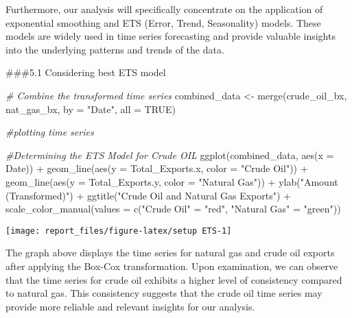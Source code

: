\documentclass[
]{article}
\newenvironment{Shaded}{\begin{snugshade}}{\end{snugshade}}
\newcommand{\AttributeTok}[1]{\textcolor[rgb]{0.77,0.63,0.00}{#1}}
\newcommand{\CommentTok}[1]{\textcolor[rgb]{0.56,0.35,0.01}{\textit{#1}}}
\newcommand{\ConstantTok}[1]{\textcolor[rgb]{0.00,0.00,0.00}{#1}}
\newcommand{\FunctionTok}[1]{\textcolor[rgb]{0.00,0.00,0.00}{#1}}
\newcommand{\NormalTok}[1]{#1}
\newcommand{\OtherTok}[1]{\textcolor[rgb]{0.56,0.35,0.01}{#1}}
\newcommand{\SpecialCharTok}[1]{\textcolor[rgb]{0.00,0.00,0.00}{#1}}
\newcommand{\StringTok}[1]{\textcolor[rgb]{0.31,0.60,0.02}{#1}}
\begin{document}
Furthermore, our analysis will specifically concentrate on the
application of exponential smoothing and ETS (Error, Trend, Seasonality)
models. These models are widely used in time series forecasting and
provide valuable insights into the underlying patterns and trends of the
data.

\#\#\#5.1 Considering best ETS model

\begin{Shaded}
\begin{Highlighting}[]
\CommentTok{\# Combine the transformed time series}
\NormalTok{combined\_data }\OtherTok{\textless{}{-}} \FunctionTok{merge}\NormalTok{(crude\_oil\_bx, nat\_gas\_bx, }\AttributeTok{by =} \StringTok{"Date"}\NormalTok{, }\AttributeTok{all =} \ConstantTok{TRUE}\NormalTok{)}

\CommentTok{\#plotting time series}

\CommentTok{\#Determining the ETS Model for Crude OIL}
\FunctionTok{ggplot}\NormalTok{(combined\_data, }\FunctionTok{aes}\NormalTok{(}\AttributeTok{x =}\NormalTok{ Date)) }\SpecialCharTok{+}
  \FunctionTok{geom\_line}\NormalTok{(}\FunctionTok{aes}\NormalTok{(}\AttributeTok{y =}\NormalTok{ Total\_Exports.x, }\AttributeTok{color =} \StringTok{"Crude Oil"}\NormalTok{)) }\SpecialCharTok{+}
  \FunctionTok{geom\_line}\NormalTok{(}\FunctionTok{aes}\NormalTok{(}\AttributeTok{y =}\NormalTok{ Total\_Exports.y, }\AttributeTok{color =} \StringTok{"Natural Gas"}\NormalTok{)) }\SpecialCharTok{+}
  \FunctionTok{ylab}\NormalTok{(}\StringTok{"Amount (Transformed)"}\NormalTok{) }\SpecialCharTok{+}
  \FunctionTok{ggtitle}\NormalTok{(}\StringTok{"Crude Oil and Natural Gas Exports"}\NormalTok{) }\SpecialCharTok{+}
  \FunctionTok{scale\_color\_manual}\NormalTok{(}\AttributeTok{values =} \FunctionTok{c}\NormalTok{(}\StringTok{"Crude Oil"} \OtherTok{=} \StringTok{"red"}\NormalTok{, }\StringTok{"Natural Gas"} \OtherTok{=} \StringTok{"green"}\NormalTok{))}
\end{Highlighting}
\end{Shaded}

\begin{center}\texttt{[image: report\_files/figure-latex/setup ETS-1]} \end{center}

The graph above displays the time series for natural gas and crude oil
exports after applying the Box-Cox transformation. Upon examination, we
can observe that the time series for crude oil exhibits a higher level
of consistency compared to natural gas. This consistency suggests that
the crude oil time series may provide more reliable and relevant
insights for our analysis.
\end{document}
